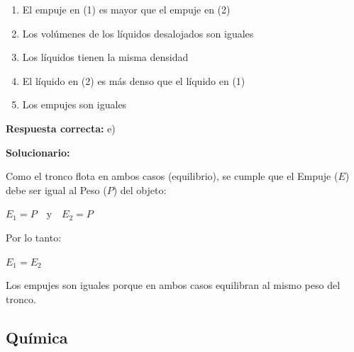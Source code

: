 \begin{enumerate}[resume]
	\begin{enumerate}[label=\alph*)]
		\item El empuje en (1) es mayor que el empuje en (2)
		\item Los volúmenes de los líquidos desalojados son iguales
		\item Los líquidos tienen la misma densidad
		\item El líquido en (2) es más denso que el líquido en (1)
		\item Los empujes son iguales
	\end{enumerate}
	\textbf{Respuesta correcta:} e)
	
	\vspace{2mm}
	\textbf{Solucionario:}
	
	Como el tronco flota en ambos casos (equilibrio), se cumple que el Empuje ($E$) debe ser igual al Peso ($P$) del objeto:
	
	$ E_1 = P \quad \text{y} \quad E_2 = P $
	
	Por lo tanto:
	
	$ E_1 = E_2 $
	
	Los empujes son iguales porque en ambos casos equilibran al mismo peso del tronco.
	
	\vspace{6mm}
	
\end{enumerate}





\subsection*{Química}

